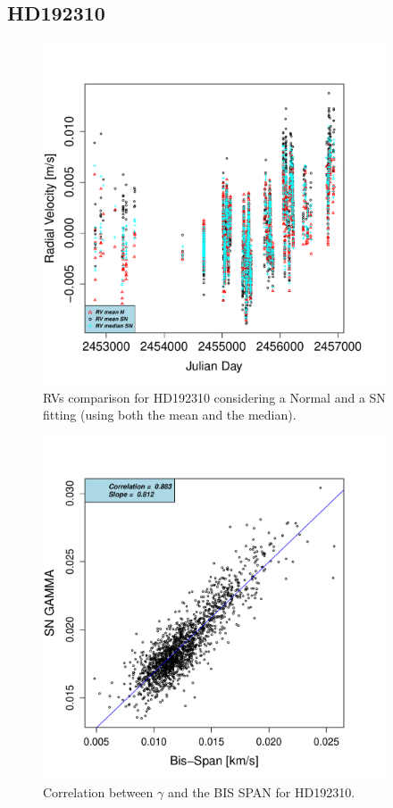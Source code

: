 \documentclass[11pt, oneside]{article}
\begin{document}
\subsection{HD192310}  \label{sec:Gl785}
%
\begin{figure}[htbp]
   \centering
\includegraphics[height = 4in]{[0]HD19231_vs_time.pdf} 
   \caption{RVs comparison for HD192310 considering a Normal and a SN fitting (using both the mean and the median).}
   \label{fig:HD192310:RV}
\end{figure}
%
\begin{figure}[htbp]
   \centering
\includegraphics[height = 4in]{HD19231_[2]gamma_vs_bisspan.pdf} 
   \caption{Correlation between $\gamma$ and the BIS SPAN for HD192310.}
   \label{fig:Gliese785:corr.gamma}
\end{figure}
\end{document}
